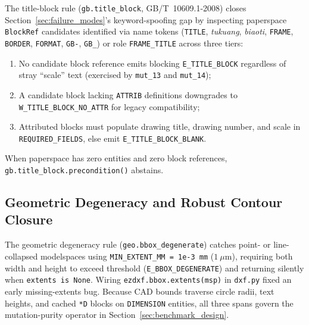\documentclass[nocopyright,nolists,upint,varvw,hyphenate]{asmejour}
\begin{document}
The title-block rule (\texttt{gb.title\_block}, GB/T~10609.1-2008) closes Section~\ref{sec:failure_modes}'s keyword-spoofing gap by inspecting paperspace \texttt{BlockRef} candidates identified via name tokens (\texttt{TITLE}, \emph{tukuang}, \emph{biaoti}, \texttt{FRAME}, \texttt{BORDER}, \texttt{FORMAT}, \texttt{GB-}, \texttt{GB\_}) or role \texttt{FRAME\_TITLE} across three tiers:
\begin{enumerate}
\item No candidate block reference emits blocking \texttt{E\_TITLE\_BLOCK} regardless of stray ``scale'' text (exercised by \texttt{mut\_13} and \texttt{mut\_14});
\item A candidate block lacking \texttt{ATTRIB} definitions downgrades to \texttt{W\_TITLE\_BLOCK\_NO\_ATTR} for legacy compatibility;
\item Attributed blocks must populate drawing title, drawing number, and scale in \texttt{REQUIRED\_FIELDS}, else emit \texttt{E\_TITLE\_BLOCK\_BLANK}.
\end{enumerate}
When paperspace has zero entities and zero block references, \texttt{gb.title\_block.precondition()} abstains.

\subsection{Geometric Degeneracy and Robust Contour Closure}\label{sec:bbox_profile}

The geometric degeneracy rule (\texttt{geo.bbox\_degenerate}) catches point- or line-collapsed modelspaces using \texttt{MIN\_EXTENT\_MM = 1e-3~mm} ($1~\mu$m), requiring both width and height to exceed threshold (\texttt{E\_BBOX\_DEGENERATE}) and returning silently when \texttt{extents is None}. Wiring \texttt{ezdxf.bbox.extents(msp)} in \texttt{dxf.py} fixed an early missing-extents bug. Because CAD bounds traverse circle radii, text heights, and cached \texttt{*D} blocks on \texttt{DIMENSION} entities, all three spans govern the mutation-purity operator in Section~\ref{sec:benchmark_design}.
\end{document}
